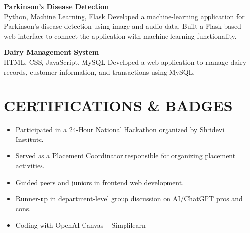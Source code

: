 \documentclass[9.5pt,a4paper]{extarticle}
\begin{document}
\noindent \textbf{Parkinson’s Disease Detection} \\
Python, Machine Learning, Flask Developed a machine-learning application for Parkinson’s disease detection using image and audio data. Built a Flask-based web interface to connect the application with machine-learning functionality. \vspace{4pt}

\noindent \textbf{Dairy Management System} \\
HTML, CSS, JavaScript, MySQL Developed a web application to manage dairy records, customer information, and transactions using MySQL. \vspace{4pt}


\section*{CERTIFICATIONS \& BADGES}
\begin{itemize}[leftmargin=0.2in, itemsep=1pt, topsep=1pt]
    \item Participated in a 24-Hour National Hackathon organized by Shridevi Institute.
    \item Served as a Placement Coordinator responsible for organizing placement activities.
    \item Guided peers and juniors in frontend web development.
    \item Runner-up in department-level group discussion on AI/ChatGPT pros and cons.
    \item Coding with OpenAI Canvas – Simplilearn
\end{itemize}
\end{document}
